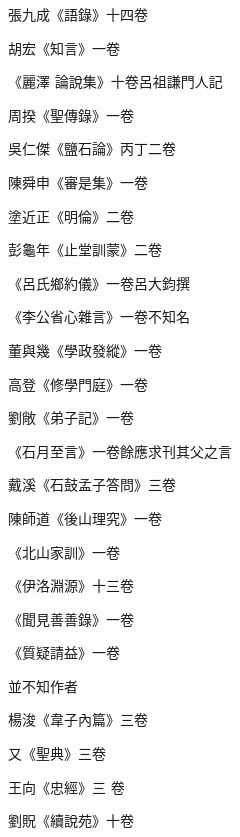 \begin{pinyinscope}
 張九成《語錄》十四卷



 胡宏《知言》一卷



 《麗澤
 論說集》十卷呂祖謙門人記



 周揆《聖傳錄》一卷



 吳仁傑《鹽石論》丙丁二卷



 陳舜申《審是集》一卷



 塗近正《明倫》二卷



 彭龜年《止堂訓蒙》二卷



 《呂氏鄉約儀》一卷呂大鈞撰



 《李公省心雜言》一卷不知名



 董與幾《學政發縱》一卷



 高登《修學門庭》一卷



 劉敞《弟子記》一卷



 《石月至言》一卷餘應求刊其父之言



 戴溪《石鼓孟子答問》三卷



 陳師道《後山理究》一卷



 《北山家訓》一卷



 《伊洛淵源》十三卷



 《聞見善善錄》一卷



 《質疑請益》一卷



 並不知作者



 楊浚《韋子內篇》三卷



 又《聖典》三卷



 王向《忠經》三
 卷



 劉貺《續說苑》十卷




\end{pinyinscope}
